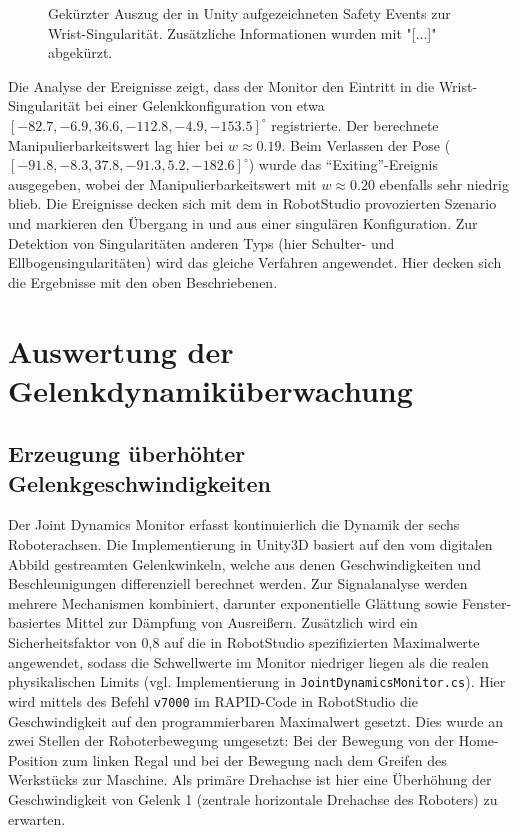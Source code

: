 \begin{figure}[H]
  \inputminted[fontsize=\footnotesize,breaklines]{json}{code-snippets/singularityerror.json}
  \caption{Gekürzter Auszug der in Unity aufgezeichneten Safety
    Events zur Wrist-Singularität. Zusätzliche Informationen wurden mit "[...]"
  abgekürzt.}
  \label{lst:singularity_json}
\end{figure}

Die Analyse der Ereignisse zeigt, dass der Monitor den Eintritt in
die Wrist-Singularität
bei einer Gelenkkonfiguration von etwa
$[-82.7, -6.9, 36.6, -112.8, -4.9, -153.5]^\circ$ registrierte. Der berechnete
Manipulierbarkeitswert lag hier bei $w \approx 0.19$. Beim Verlassen der Pose
($[-91.8, -8.3, 37.8, -91.3, 5.2, -182.6]^\circ$) wurde das
\enquote{Exiting}-Ereignis
ausgegeben, wobei der Manipulierbarkeitswert mit $w \approx 0.20$
ebenfalls sehr niedrig blieb.
Die Ereignisse decken sich mit dem in RobotStudio provozierten
Szenario und markieren den
Übergang in und aus einer singulären Konfiguration.
Zur Detektion von Singularitäten anderen Typs (hier Schulter- und
Ellbogensingularitäten) wird das gleiche Verfahren angewendet. Hier decken sich
die Ergebnisse mit den oben Beschriebenen.

\section{Auswertung der Gelenkdynamiküberwachung}
\label{sec:Analyse_Sicherheit}

\subsection{Erzeugung überhöhter Gelenkgeschwindigkeiten}
Der Joint Dynamics Monitor erfasst kontinuierlich die Dynamik der sechs
Roboterachsen. Die Implementierung in Unity3D basiert auf den vom digitalen
Abbild gestreamten Gelenkwinkeln, welche aus denen Geschwindigkeiten und
Beschleunigungen differenziell berechnet werden. Zur Signalanalyse werden
mehrere Mechanismen kombiniert, darunter exponentielle Glättung sowie
Fenster-basiertes Mittel zur Dämpfung von Ausreißern. Zusätzlich wird ein
Sicherheitsfaktor von 0{,}8 auf die in RobotStudio spezifizierten Maximalwerte
angewendet, sodass die Schwellwerte im Monitor niedriger liegen als die realen
physikalischen Limits (vgl. Implementierung in
\texttt{JointDynamicsMonitor.cs}). Hier wird mittels des Befehl \texttt{v7000}
im RAPID-Code in RobotStudio die Geschwindigkeit auf den programmierbaren
Maximalwert gesetzt. Dies wurde an zwei Stellen der Roboterbewegung umgesetzt:
Bei der Bewegung von der Home-Position zum linken Regal und bei der Bewegung
nach dem Greifen des Werkstücks zur Maschine. Als primäre Drehachse ist hier
eine Überhöhung der Geschwindigkeit von Gelenk 1 (zentrale horizontale Drehachse
des Roboters) zu erwarten.

